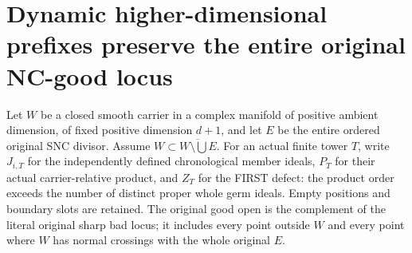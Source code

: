 \section{Dynamic higher-dimensional prefixes preserve the entire original NC-good locus}

Let $W$ be a closed smooth carrier in a complex manifold of positive ambient
dimension, of fixed positive dimension $d+1$, and let $E$ be the entire ordered
original SNC divisor. Assume $W\subset\overline{W\setminus\bigcup E}$.
For an actual finite tower $T$, write $J_{i,T}$ for the independently defined
chronological member ideals, $P_T$ for their actual carrier-relative product,
and $Z_T$ for the FIRST defect: the product order exceeds the number of
distinct proper whole germ ideals. Empty positions and boundary slots are
retained. The original good open is the complement of the literal original
sharp bad locus; it includes every point outside $W$ and every point where
$W$ has normal crossings with the whole original $E$.

